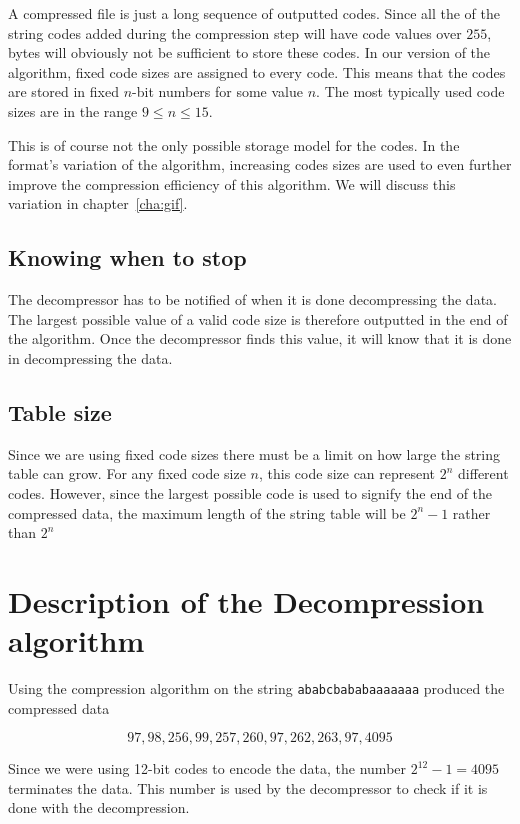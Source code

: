 A \lzw compressed file is just a long sequence of outputted codes.
Since all the of the string codes added during the compression step
will have code values over $255$, bytes will obviously not be
sufficient to store these codes. In our version of the \lzw algorithm,
fixed code sizes are assigned to every code. This means that the codes
are stored in fixed $n$-bit numbers for some value $n$. The most
typically used code sizes are in the range $9 \leq n \leq 15$.

This is of course not the only possible storage model for the
codes. In the \gif format's variation of the \lzw algorithm,
increasing codes sizes are used to even further improve the
compression efficiency of this algorithm. We will discuss this
variation in chapter~\ref{cha:gif}.

\subsection{Knowing when to stop}

The decompressor has to be notified of when it is done decompressing
the data. The largest possible value of a valid code size is therefore
outputted in the end of the algorithm. Once the decompressor finds
this value, it will know that it is done in decompressing the data.

\subsection{Table size}

Since we are using fixed code sizes there must be a limit on how large
the string table can grow. For any fixed code size $n$, this code size
can represent $2^n$ different codes. However, since the largest
possible code is used to signify the end of the compressed data, the
maximum length of the string table will be $2^n - 1$ rather than $2^n$

\section{Description of the Decompression algorithm}

Using the compression algorithm \lzw on the string
\texttt{ababcbababaaaaaaa} produced the compressed data

\begin{equation*}
 97,98,256,99,257,260,97,262,263,97,4095
\end{equation*}

Since we were using 12-bit codes to encode the data, the number
$2^{12} - 1 = 4095$ terminates the data. This number is used by the
decompressor to check if it is done with the decompression.

